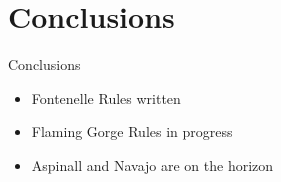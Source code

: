 \documentclass{beamer}
\begin{document}
\section{Conclusions}
\begin{frame}{Conclusions}
\begin{itemize}
\item Fontenelle Rules written 
\item Flaming Gorge Rules in progress
\item Aspinall and Navajo are on the horizon
\end{itemize}
\end{frame}

\section{~}
\end{document}
